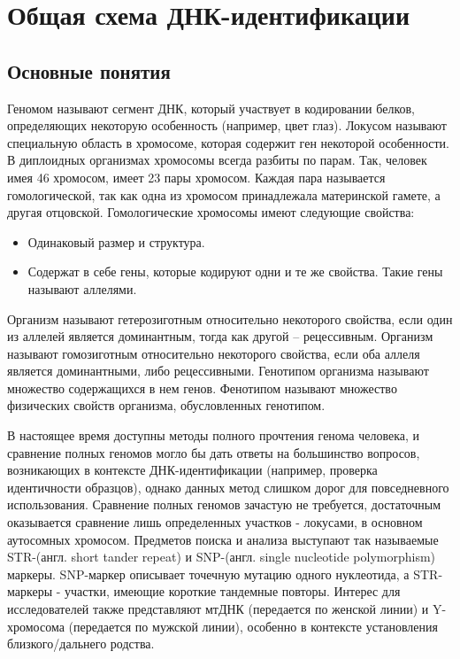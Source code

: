 \chapter{Общая схема ДНК-идентификации}

\section{Основные понятия}

Геномом называют сегмент ДНК, который участвует в кодировании белков, определяющих
некоторую особенность (например, цвет глаз). Локусом называют специальную область в хромосоме,
которая содержит ген некоторой особенности. В диплоидных организмах хромосомы всегда
разбиты по парам. Так, человек имея 46 хромосом, имеет 23 пары хромосом.
Каждая пара называется гомологической, так как одна из хромосом принадлежала материнской гамете, а другая отцовской.
Гомологические хромосомы имеют следующие свойства:
\begin{itemize}
\item Одинаковый размер и структура.
\item Содержат в себе гены, которые кодируют одни и те же свойства. Такие гены называют аллелями.
\end{itemize}
Организм называют гетерозиготным относительно некоторого свойства, если один из аллелей является доминантным,
тогда как другой -- рецессивным.
Организм называют гомозиготным относительно некоторого свойства, если оба аллеля является доминантными,
либо рецессивными.
Генотипом организма называют множество содержащихся в нем генов.
Фенотипом называют множество физических свойств организма, обусловленных генотипом.

В настоящее время доступны методы полного прочтения генома человека, и сравнение полных геномов могло бы
дать ответы на большинство вопросов, возникающих в контексте ДНК-идентификации (например, проверка идентичности образцов),
однако данных метод слишком дорог для повседневного использования. Сравнение полных геномов зачастую не требуется, достаточным оказывается
сравнение лишь определенных участков - локусами, в основном аутосомных хромосом. Предметов поиска и анализа выступают так называемые
STR-(англ. short tander repeat) и SNP-(англ. single nucleotide polymorphism) маркеры. SNP-маркер описывает точечную мутацию одного
нуклеотида, а STR-маркеры - участки, имеющие короткие тандемные повторы.
Интерес для исследователей также представляют мтДНК (передается по женской линии) и Y-хромосома (передается по мужской линии),
особенно в контексте установления близкого/дальнего родства.

